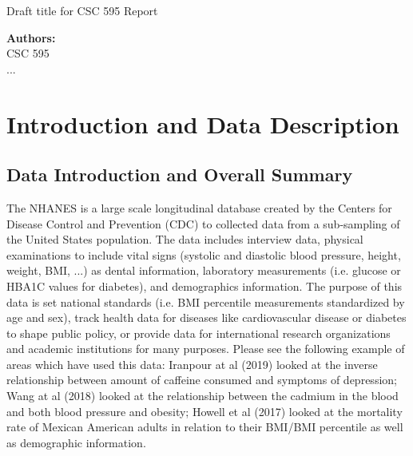 \documentclass[12pt]{article}
\numberwithin{figure}{section}
\begin{document}
 \begin{center}{\large{\sf Draft title for CSC 595 Report}}\end{center}
\sloppy
\begin{spacing}{1.70}

\begin{center}
{\bf {\sf Authors:}}\\
{\sf CSC 595 \\
...}\\
\end{center}

\end{spacing}

\setcounter{page}{1}

\setcounter{section}{0}

\newpage
{\section{Introduction and Data Description}}
{\subsection{Data Introduction and Overall Summary}}

The NHANES is a large scale longitudinal database created by the Centers for Disease Control and Prevention (CDC) to collected data from a sub-sampling of the United States population.  The data includes interview data, physical examinations to include vital signs (systolic and diastolic blood pressure, height, weight, BMI, ...) as dental information, laboratory measurements (i.e. glucose or HBA1C values for diabetes), and demographics information.  The purpose of this data is set national standards (i.e. BMI percentile measurements standardized by age and sex), track health data for diseases like cardiovascular disease or diabetes to shape public policy, or provide data for international research organizations and academic institutions for many purposes.  Please see the following example of areas which have used this data: Iranpour at al (2019) looked at the inverse relationship between amount of caffeine consumed and symptoms of depression; Wang at al (2018) looked at the relationship between the cadmium in the blood and both blood pressure and obesity; Howell et al (2017) looked at the mortality rate of Mexican American adults in relation to their BMI/BMI percentile as well as demographic information.
\end{document}
